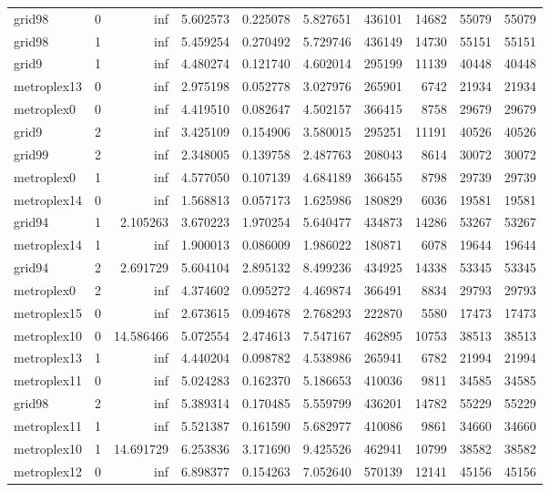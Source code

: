 \begin{longtable}{|l|r|r|r|r|r|r|r|r|r|}
grid98 & 0 & inf & 5.602573 & 0.225078 & 5.827651 & 436101 & 14682 & 55079 & 55079 \\
grid98 & 1 & inf & 5.459254 & 0.270492 & 5.729746 & 436149 & 14730 & 55151 & 55151 \\
grid9 & 1 & inf & 4.480274 & 0.121740 & 4.602014 & 295199 & 11139 & 40448 & 40448 \\
metroplex13 & 0 & inf & 2.975198 & 0.052778 & 3.027976 & 265901 & 6742 & 21934 & 21934 \\
metroplex0 & 0 & inf & 4.419510 & 0.082647 & 4.502157 & 366415 & 8758 & 29679 & 29679 \\
grid9 & 2 & inf & 3.425109 & 0.154906 & 3.580015 & 295251 & 11191 & 40526 & 40526 \\
grid99 & 2 & inf & 2.348005 & 0.139758 & 2.487763 & 208043 & 8614 & 30072 & 30072 \\
metroplex0 & 1 & inf & 4.577050 & 0.107139 & 4.684189 & 366455 & 8798 & 29739 & 29739 \\
metroplex14 & 0 & inf & 1.568813 & 0.057173 & 1.625986 & 180829 & 6036 & 19581 & 19581 \\
grid94 & 1 & 2.105263 & 3.670223 & 1.970254 & 5.640477 & 434873 & 14286 & 53267 & 53267 \\
metroplex14 & 1 & inf & 1.900013 & 0.086009 & 1.986022 & 180871 & 6078 & 19644 & 19644 \\
grid94 & 2 & 2.691729 & 5.604104 & 2.895132 & 8.499236 & 434925 & 14338 & 53345 & 53345 \\
metroplex0 & 2 & inf & 4.374602 & 0.095272 & 4.469874 & 366491 & 8834 & 29793 & 29793 \\
metroplex15 & 0 & inf & 2.673615 & 0.094678 & 2.768293 & 222870 & 5580 & 17473 & 17473 \\
metroplex10 & 0 & 14.586466 & 5.072554 & 2.474613 & 7.547167 & 462895 & 10753 & 38513 & 38513 \\
metroplex13 & 1 & inf & 4.440204 & 0.098782 & 4.538986 & 265941 & 6782 & 21994 & 21994 \\
metroplex11 & 0 & inf & 5.024283 & 0.162370 & 5.186653 & 410036 & 9811 & 34585 & 34585 \\
grid98 & 2 & inf & 5.389314 & 0.170485 & 5.559799 & 436201 & 14782 & 55229 & 55229 \\
metroplex11 & 1 & inf & 5.521387 & 0.161590 & 5.682977 & 410086 & 9861 & 34660 & 34660 \\
metroplex10 & 1 & 14.691729 & 6.253836 & 3.171690 & 9.425526 & 462941 & 10799 & 38582 & 38582 \\
metroplex12 & 0 & inf & 6.898377 & 0.154263 & 7.052640 & 570139 & 12141 & 45156 & 45156 \\

\end{longtable}
